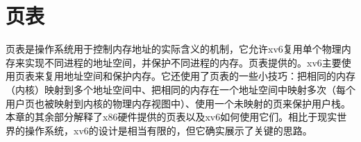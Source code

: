\chapter{页表}\label{ch02}

页表是操作系统用于控制内存地址的实际含义的机制，它允许xv6复用单个物理内存来实现不同进程的地址空间，并保护不同进程的内存。页表提供的。xv6主要使用页表来复用地址空间和保护内存。它还使用了页表的一些小技巧：把相同的内存（内核）映射到多个地址空间中、把相同的内存在一个地址空间中映射多次（每个用户页也被映射到内核的物理内存视图中）、使用一个未映射的页来保护用户栈。本章的其余部分解释了x86硬件提供的页表以及xv6如何使用它们。相比于现实世界的操作系统，xv6的设计是相当有限的，但它确实展示了关键的思路。
